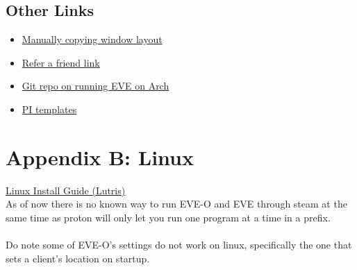 \documentclass{article}
\begin{document}
\subsection*{Other Links}
\begin{itemize}
  \item \href{https://forums.eveonline.com/t/manually-copy-settings-between-characters-and-accounts/32704}{Manually copying window layout}
  \item \href{https://www.eveonline.com/signup?invc=79ffb3de-ef43-400b-a568-e45ac72c6715}{Refer a friend link}
  \item \href{https://gist.github.com/arillat/2b7e519a69268f519d507d0ed50b9713}{Git repo on running EVE on Arch}
  \item \href{https://github.com/DalShooth/EVE_PI_Templates}{PI templates}
\end{itemize}

\section*{Appendix B: Linux}
\href{https://www.reddit.com/r/Eve/comments/1hqjm4a/linux_lutris_eve_online_eveo_preview/}{Linux Install Guide (Lutris)}\\
As of now there is no known way to run EVE-O and EVE through steam at the same time as proton will only let you run one program 
at a time in a prefix.
\\
\\
Do note some of EVE-O's settings do not work on linux, specifically the one that sets a client's location on startup.



\end{document}
